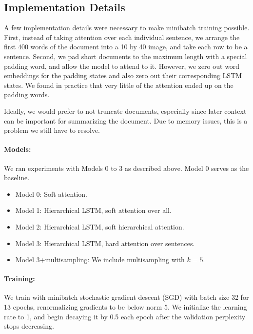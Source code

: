 \documentclass[11pt]{article}
\begin{document}
\subsection{Implementation Details}

A few implementation details were necessary to make minibatch training possible. First, instead of taking attention over each individual sentence, we arrange the first 400 words of the document into a 10 by 40 image, and take each row to be a sentence. Second, we pad short documents to the maximum length with a special padding word, and allow the model to attend to it. However, we zero out word embeddings for the padding states and also zero out their corresponding LSTM states. We found in practice that very little of the attention ended up on the padding words.

Ideally, we would prefer to not truncate documents, especially since later context can be important for summarizing the document. Due to memory issues, this is a problem we still have to resolve.

\noindent \paragraph{Models:}

We ran experiments with Models 0 to 3 as described above. Model 0 serves as the baseline.

\begin{itemize}
\item Model 0: Soft attention.
\item Model 1: Hierarchical LSTM, soft attention over all.
\item Model 2: Hierarchical LSTM, soft hierarchical attention.
\item Model 3: Hierarchical LSTM, hard attention over sentences.
\item Model 3+multisampling: We include multisampling with $k=5$.
\end{itemize}

\noindent \paragraph{Training:}

We train with minibatch stochastic gradient descent (SGD) with batch size 32 for 13 epochs, renormalizing gradients to be below norm 5. We initialize the learning rate to 1, and begin decaying it by 0.5 each epoch after the validation perplexity stops decreasing. 
\end{document}

